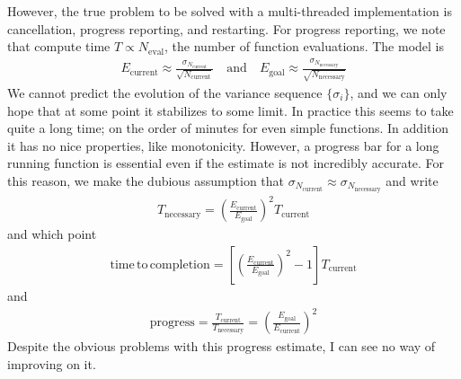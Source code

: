 \documentclass[landscape]{article}
\numberwithin{equation}{section}
\begin{document}
However, the true problem to be solved with a multi-threaded implementation is cancellation, progress reporting, and restarting.
For progress reporting, we note that compute time $T \propto N_{\mathrm{eval}}$, the number of function evaluations.
The model is
\begin{align*}
E_{\mathrm{current}} \approx \frac{\sigma_{N_{\mathrm{current}}}}{\sqrt{N_{\mathrm{current}}}}
\quad \mathrm{and} \quad
E_{\mathrm{goal}} \approx \frac{\sigma_{N_{\mathrm{necessary}}}}{\sqrt{N_{\mathrm{necessary}}}}
\end{align*}
We cannot predict the evolution of the variance sequence $\{\sigma_{i}\}$, and we can only hope that at some point it stabilizes to some limit.
In practice this seems to take quite a long time; on the order of minutes for even simple functions.
In addition it has no nice properties, like monotonicity.
However, a progress bar for a long running function is essential even if the estimate is not incredibly accurate.
For this reason, we make the dubious assumption that $\sigma_{N_{\mathrm{current}}} \approx \sigma_{N_{\mathrm{necessary}}}$ and write
\begin{align*}
T_{\mathrm{necessary}} = \left( \frac{E_{\mathrm{current}}}{E_{\mathrm{goal}}} \right)^{2}T_{\mathrm{current}}
\end{align*}
and which point
\begin{align*}
\mathrm{time\, to\, completion } = \left[\left( \frac{E_{\mathrm{current}}}{E_{\mathrm{goal}}} \right)^{2} -1 \right]T_{\mathrm{current}}
\end{align*}
and
\begin{align*}
\mathrm{progress} = \frac{T_{\mathrm{current}}}{T_{\mathrm{necessary}}} = \left( \frac{E_{\mathrm{goal}}}{E_{\mathrm{current}}} \right)^{2}
\end{align*}
Despite the obvious problems with this progress estimate, I can see no way of improving on it.
\end{document}
